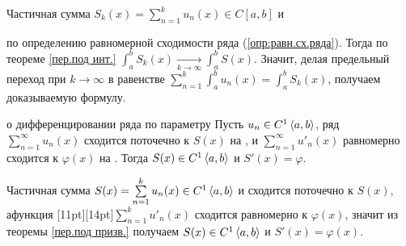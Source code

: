 \begin{prf}
		Частичная сумма $S_k(x) = \sum\limits_{n = 1}^{k}u_n(x) \in C[a, b]$ и\! по определению равномерной сходимости ряда (\ref{опр:равн.сх.ряда}). Тогда по теореме \ref{пер.под инт.} $\int_a^b S_k(x) \xrightarrow[k \to \infty]{} \int_a^b S(x)$. Значит, делая предельный переход при $k \to \infty$ в равенстве $\sum\limits_{n = 1}^{k}\int_a^b u_n(x) = \int_a^b S_k(x)$, получаем доказываемую формулу. 
\end{prf}

\begin{teor}[https://www.youtube.com/live/g4Zgeu8xe-Q?si=VKzpWKydqsZrl_u4&t=12003]{о дифференцировании ряда по параметру}
	Пусть $u_n\in C^1 \left<a, b\right>$, ряд $\sum\limits_{n = 1}^{\infty} u_n(x)$ сходится поточечно к $S(x)$ на , и $\sum\limits_{n = 1}^{\infty} u'_n(x)$ равномерно сходится к $\varphi(x)$ на . Тогда $S(x) \in C^1\left<a,b\right>$ и $S'(x) = \varphi$.
\end{teor}

\begin{prf}
	Частичная сумма $S(x) = \sum\limits_{n = 1}^{k}u_n(x) \in C^1\left<a, b\right>$ и сходится поточечно к $S(x)$, а\linebreak функция \raisebox{0pt}[11pt][14pt]{$\sum\limits_{n = 1}^{k} u'_n(x)$} сходится равномерно к $\varphi(x)$, значит из теоремы \ref{пер.под призв.} получаем $S(x) \in C^1\left<a, b\right>$ и $S'(x) = \varphi(x)$. 
\end{prf}